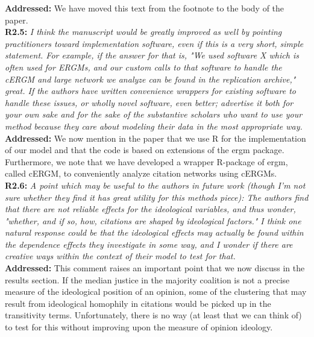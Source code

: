 \documentclass[a4paper,11pt]{texMemo}
\begin{document}
\noindent \textbf{Addressed:}  We have moved this text from the footnote to the body of the paper.\\


\noindent \textbf{R2.5:} \emph{ I think the manuscript would be greatly improved as well by pointing practitioners toward implementation software, even if this is a very short, simple statement. For example, if the answer for that is, "We used software X which is often used for ERGMs, and our custom calls to that software to handle the cERGM and large network we analyze can be found in the replication archive," great. If the authors have written convenience wrappers for existing software to handle these issues, or wholly novel software, even better; advertise it both for your own sake and for the sake of the substantive scholars who want to use your method because they care about modeling their data in the most appropriate way.}\\

\noindent \textbf{Addressed:} We now mention in the paper that we use R for the implementation of our model and that the code is based on extensions of the ergm package. Furthermore, we note that we have developed a wrapper R-package of ergm, called cERGM, to conveniently analyze citation networks using cERGMs.  \\

\noindent \textbf{R2.6:} \emph{ A point which may be useful to the authors in future work (though I'm not sure whether they find it has great utility for this methods piece): The authors find that there are not reliable effects for the ideological variables, and thus wonder, "whether, and if so, how, citations are shaped by ideological factors." I think one natural response could be that the ideological effects may actually be found within the dependence effects they investigate in some way, and I wonder if there are creative ways within the context of their model to test for that.}\\

\noindent \textbf{Addressed:}  This comment raises an important point that we now discuss in the results section. If the median justice in the majority coalition is not a precise measure of the ideological position of an opinion, some of the clustering that may result from ideological homophily in citations would be picked up in the transitivity terms. Unfortunately, there is no way (at least that we can think of) to test for this without improving upon the measure of opinion ideology. 


\printbibliography
\end{document}
